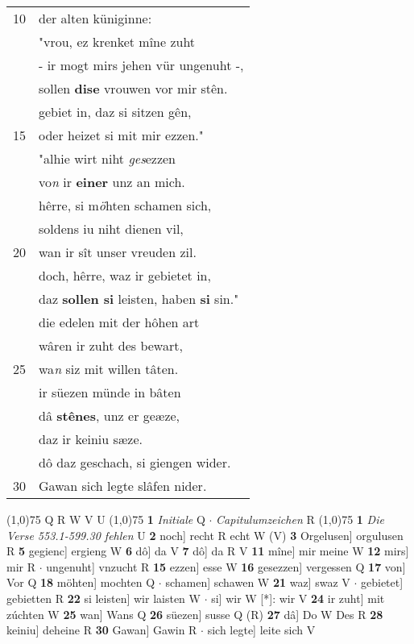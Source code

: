 \documentclass[8pt,a4paper,notitlepage]{article}
\begin{document}
\begin{table}[ht]
\begin{minipage}[t]{0.5\linewidth}
\begin{tabular}{rl}
10 & der alten küniginne:\\ 
 & "vrou, ez krenket mîne zuht\\ 
 & - ir mogt mirs jehen vür ungenuht -,\\ 
 & sollen \textbf{dise} vrouwen vor mir stên.\\ 
 & gebiet in, daz si sitzen gên,\\ 
15 & oder heizet si mit mir ezzen."\\ 
 & "alhie wirt niht \textit{ges}ezzen\\ 
 & vo\textit{n} ir \textbf{einer} unz an mich.\\ 
 & hêrre, si m\textit{ö}hten schamen sich,\\ 
 & soldens iu niht dienen vil,\\ 
20 & wan ir sît unser vreuden zil.\\ 
 & doch, hêrre, waz ir gebietet in,\\ 
 & daz \textbf{sollen si} leisten, haben \textbf{si} sin."\\ 
 & die edelen mit der hôhen art\\ 
 & wâren ir zuht des bewart,\\ 
25 & wa\textit{n} siz mit willen tâten.\\ 
 & ir süezen münde in bâten\\ 
 & dâ \textbf{stênes}, unz er geæze,\\ 
 & daz ir keiniu sæze.\\ 
 & dô daz geschach, si giengen wider.\\ 
30 & Gawan sich legte slâfen nider.\\ 
\end{tabular}
\scriptsize
\line(1,0){75} \newline
Q R W V U \newline
\line(1,0){75} \newline
\textbf{1} \textit{Initiale} Q   $\cdot$ \textit{Capitulumzeichen} R  \newline
\line(1,0){75} \newline
\textbf{1} \textit{Die Verse 553.1-599.30 fehlen} U  \textbf{2} noch] recht R echt W (V) \textbf{3} Orgelusen] orgulusen R \textbf{5} gegienc] ergieng W \textbf{6} dô] da V \textbf{7} dô] da R V \textbf{11} mîne] mir meine W \textbf{12} mirs] mir R  $\cdot$ ungenuht] vnzucht R \textbf{15} ezzen] esse W \textbf{16} gesezzen] vergessen Q \textbf{17} von] Vor Q \textbf{18} möhten] mochten Q  $\cdot$ schamen] schawen W \textbf{21} waz] swaz V  $\cdot$ gebietet] gebietten R \textbf{22} si leisten] wir laisten W  $\cdot$ si] wir W [*]: wir V \textbf{24} ir zuht] mit zúchten W \textbf{25} wan] Wans Q \textbf{26} süezen] susse Q (R) \textbf{27} dâ] Do W Des R \textbf{28} keiniu] deheine R \textbf{30} Gawan] Gawin R  $\cdot$ sich legte] leite sich V \newline
\end{minipage}
\end{table}
\end{document}
